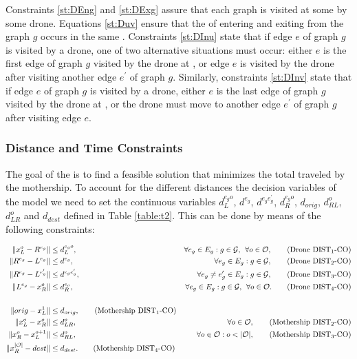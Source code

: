 \noindent 
{}  Constraints \eqref{st:DEng} and \eqref{st:DExg} assure that each graph is visited at some  by some drone. Equations \eqref{st:Duv} ensure that the  of entering and exiting from the graph $g$ occurs in the same . Constraints \eqref{st:DInu} state that if  edge $e$ of graph $g$ is visited by a drone, one of two alternative situations must occur: either $e$ is the first edge of graph $g$ visited by the drone at , or edge $e$ is visited by the drone after visiting another edge $e^\prime$ of graph $g$. Similarly, constraints \eqref{st:DInv} state that if  edge $e$ of graph $g$ is visited by a drone, either $e$ is the last edge of graph $g$ visited by the drone at , or the drone must move to another edge $e^\prime$ of graph $g$ after visiting edge $e$.

\subsubsection*{Distance and Time Constraints}
\noindent
The goal of the \AMDCO\xspace is to find a feasible solution that minimizes the total  traveled by the mothership. To account for the different distances  the decision variables of the model we need to set the continuous variables $d_L^{e_go}$, $d^{e_g}$, $d^{e_ge^\prime_g}$, $d_R^{e_go}$, $d_{orig}$, $d_{RL}^o$, $d_{LR}^o$ and $d_{dest}$ defined in Table \ref{table:t2}. This can be done by means of the following constraints:

\begin{align*}
\|x_L^o- R^{e_g}\| & \leq  d_L^{e_go},  &\forall e_g\in E_g:g\in \mathcal{G}, \:\:\forall o\in \mathcal O, \tag{Drone DIST$_{1}$-CO} \label{eq:drone-d1-async-CO}\\
\|R^{e_g}- L^{e_g}\| & \leq  d^{e_g},  &\forall e_g\in E_g:g\in \mathcal{G}, \tag{Drone DIST$_{2}$-CO} \label{eq:drone-d2-async-CO}\\
\|R^{e_g}- L^{e'_g}\| & \leq  d^{e_ge'_g}, &\forall e_g\neq e_g'\in E_g:g\in \mathcal{G}, \tag{Drone DIST$_{3}$-CO} \label{eq:drone-d3-async-CO}\\
\|L^{e_g}- x_R^o\| & \leq  d_R^{e_o}, &\forall e_g\in E_g:g\in \mathcal{G},\:\:\forall o\in \mathcal O. \tag{Drone DIST$_{4}$-CO} \label{eq:drone-d4-async-CO}\\\\
\|orig - x_L^1\| & \leq d_{orig}, \tag{Mothership DIST$_1$-CO}\label{eq:mothership-d1-async-CO}\\
\|x_L^o - x_R^{o}\| & \leq d_{LR}^{o}, &\forall o\in\mathcal O, \tag{Mothership DIST$_{2}$-CO}\label{eq:mothership-d3-async-CO}\\
\|x_R^o - x_L^{o+1}\| & \leq d_{RL}^{o}, &\forall o\in\mathcal O:o<|\mathcal O|, \tag{Mothership DIST$_{3}$-CO}\label{eq:mothership-d4-async-CO}\\
\|x_R^{|\mathcal O|} - dest\| & \leq d_{dest}. \tag{Mothership DIST$_4$-CO}\label{eq:mothership-d6-async-CO}
\end{align*}

